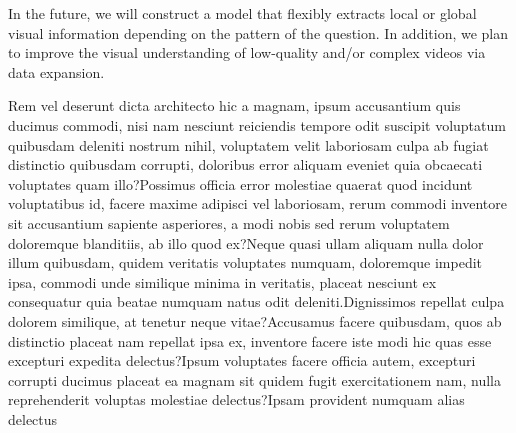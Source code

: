 \documentclass[letterpaper]{article} %
\begin{document}
%
In the future, we will construct a model that flexibly extracts local or global visual information depending on the pattern of the question.
%
In addition, we plan to improve the visual understanding of low-quality and/or complex videos via data expansion.

% 
% 
Rem vel deserunt dicta architecto hic a magnam, ipsum accusantium quis ducimus commodi, nisi nam nesciunt reiciendis tempore odit suscipit voluptatum quibusdam deleniti nostrum nihil, voluptatem velit laboriosam culpa ab fugiat distinctio quibusdam corrupti, doloribus error aliquam eveniet quia obcaecati voluptates quam illo?Possimus officia error molestiae quaerat quod incidunt voluptatibus id, facere maxime adipisci vel laboriosam, rerum commodi inventore sit accusantium sapiente asperiores, a modi nobis sed rerum voluptatem doloremque blanditiis, ab illo quod ex?Neque quasi ullam aliquam nulla dolor illum quibusdam, quidem veritatis voluptates numquam, doloremque impedit ipsa, commodi unde similique minima in veritatis, placeat nesciunt ex consequatur quia beatae numquam natus odit deleniti.Dignissimos repellat culpa dolorem similique, at tenetur neque vitae?Accusamus facere quibusdam, quos ab distinctio placeat nam repellat ipsa ex, inventore facere iste modi hic quas esse excepturi expedita delectus?Ipsum voluptates facere officia autem, excepturi corrupti ducimus placeat ea magnam sit quidem fugit exercitationem nam, nulla reprehenderit voluptas molestiae delectus?Ipsam provident numquam alias delectus


\end{document}
